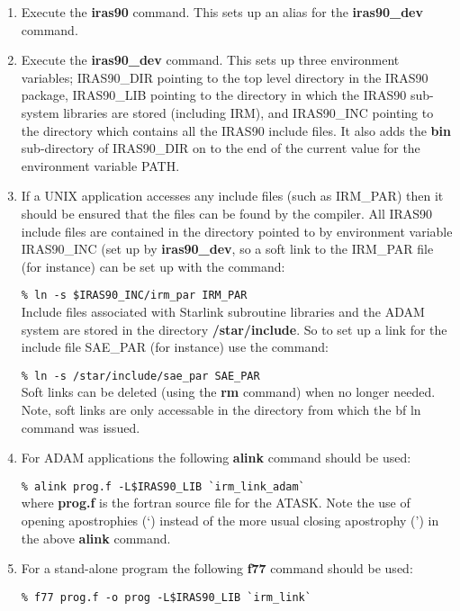 \begin{enumerate}
\item Execute the {\bf iras90} command. This sets up an alias for the 
{\bf iras90\_dev} command.

\item Execute the {\bf iras90\_dev} command.  This sets up three
environment variables; IRAS90\_DIR pointing to the top level directory
in the IRAS90 package, IRAS90\_LIB pointing to the directory in which
the IRAS90 sub-system libraries are stored (including IRM), and
IRAS90\_INC pointing to the directory which contains all the IRAS90
include files. It also adds the {\bf bin} sub-directory of IRAS90\_DIR
on to the end of the current value for the environment variable PATH. 

\item If a UNIX application accesses any include files (such as
IRM\_PAR) then it should be ensured that the files can be found by the
compiler. All IRAS90 include files are contained in the directory
pointed to by environment variable IRAS90\_INC (set up by {\bf
iras90\_dev}, so a soft link to the IRM\_PAR file (for instance) can be
set up with the command: 

\verb+% ln -s $IRAS90_INC/irm_par IRM_PAR+\\

Include files associated with Starlink subroutine libraries and the
ADAM system are stored in the directory {\bf /star/include}. So to set
up a link for the include file SAE\_PAR (for instance) use the command:

\verb+% ln -s /star/include/sae_par SAE_PAR+\\

Soft links can be deleted (using the {\bf rm} command) when no longer needed.
Note, soft links are only accessable in the directory from which the {bf ln} 
command was issued.

\item For ADAM applications the following {\bf alink} command should be used:

\verb+% alink prog.f -L$IRAS90_LIB `irm_link_adam`+\\

where {\bf prog.f} is the fortran source file for the ATASK.
Note the use of opening apostrophies (`) instead of the more usual closing
apostrophy (') in the above {\bf alink} command.

\item For a stand-alone program the following {\bf f77} command should be used:

\verb+% f77 prog.f -o prog -L$IRAS90_LIB `irm_link`+\\
\end{enumerate}


